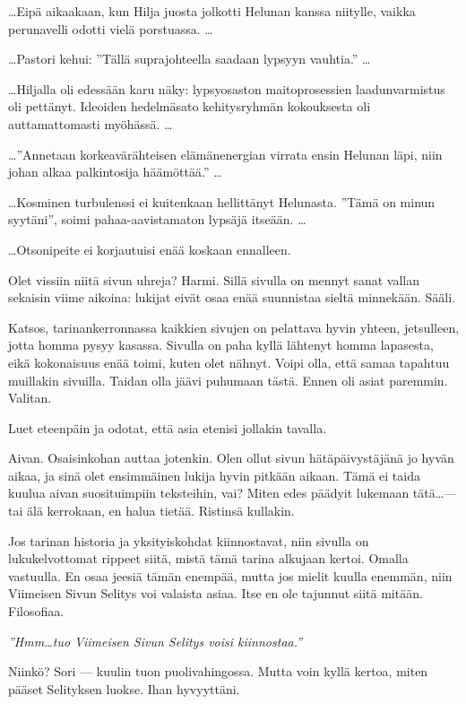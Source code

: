 \documentclass[a4paper, 12pt, finnish]{article}
\newcommand{\reader}[1]{\emph{#1}}
\newcommand{\q}[1]{''#1''}
\begin{document}
\dots  Eipä aikaakaan, kun Hilja juosta jolkotti Helunan
kanssa niitylle, vaikka perunavelli odotti vielä porstuassa. \dots

\dots  Pastori kehui: \q{Tällä suprajohteella saadaan
lypsyyn vauhtia.} \dots

\dots  Hiljalla oli edessään karu näky: lypsyosaston maitoprosessien laadunvarmistus oli pettänyt. Ideoiden hedelmäsato kehitysryhmän
kokouksesta oli auttamattomasti myöhässä. \dots

\dots  \q{Annetaan korkeavärähteisen elämänenergian virrata
ensin Helunan läpi, niin johan alkaa palkintosija häämöttää.} \dots

\dots  Kosminen turbulenssi ei kuitenkaan hellittänyt
Helunasta. \q{Tämä on minun syytäni},
soimi pahaa-aavistamaton lypsäjä itseään. \dots

\dots  Otsonipeite ei korjautuisi enää koskaan ennalleen.

\newpage
\mbox{}\label{intermission}
Olet vissiin niitä sivun \pageref{aatelinen} uhreja?
Harmi. Sillä sivulla on mennyt sanat vallan sekaisin
viime aikoina: lukijat eivät osaa enää suunnistaa
sieltä minnekään. Sääli.

Katsos, tarinankerronnassa kaikkien sivujen on pelattava
hyvin yhteen, jetsulleen, jotta homma pysyy kasassa. Sivulla
\pageref{aatelinen} on paha kyllä lähtenyt homma lapasesta,
eikä kokonaisuus enää toimi, kuten olet nähnyt. 
Voipi olla, että samaa tapahtuu muillakin sivuilla.
Taidan olla jäävi puhumaan tästä.
Ennen oli asiat paremmin.  Valitan.

Luet eteenpäin ja odotat, että asia etenisi jollakin tavalla.

Aivan. Osaisinkohan auttaa jotenkin. Olen ollut sivun
\pageref{intermission} hätäpäivystäjänä jo hyvän aikaa,
ja sinä olet ensimmäinen lukija hyvin pitkään aikaan.
Tämä ei taida kuulua aivan suosituimpiin teksteihin, vai?
Miten edes päädyit lukemaan tätä\dots --- tai älä kerrokaan,
en halua tietää. Ristinsä kullakin. 

Jos tarinan historia ja yksityiskohdat kiinnostavat,
niin sivulla \pageref{weirdpage} on lukukelvottomat
rippeet siitä, mistä tämä tarina alkujaan kertoi.
Omalla vastuulla. En osaa jeesiä tämän enempää, mutta jos
mielit kuulla enemmän,
niin Viimeisen Sivun Selitys voi valaista asiaa. Itse en
ole tajunnut siitä mitään. Filosofiaa.

\reader{\q{Hmm\dots tuo Viimeisen Sivun Selitys voisi kiinnostaa.}}

Niinkö? Sori --- kuulin tuon puolivahingossa. Mutta voin kyllä
kertoa, miten pääset Selityksen luokse. Ihan hyvyyttäni.
\end{document}
